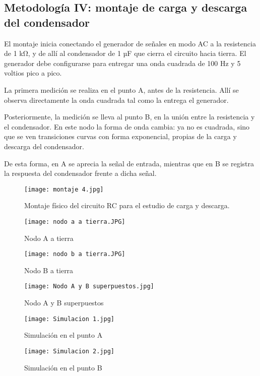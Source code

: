 \documentclass[conference]{IEEEtran} %
\begin{document}
\subsection{Metodología IV: montaje de carga y descarga del condensador}
El montaje inicia conectando el generador de señales en modo AC a la resistencia de 1 kΩ, y de allí al condensador de 1 µF que cierra el circuito hacia tierra. El generador debe configurarse para entregar una onda cuadrada de 100 Hz y 5 voltios pico a pico.

La primera medición se realiza en el punto A, antes de la resistencia. Allí se observa directamente la onda cuadrada tal como la entrega el generador.

Posteriormente, la medición se lleva al punto B, en la unión entre la resistencia y el condensador. En este nodo la forma de onda cambia: ya no es cuadrada, sino que se ven transiciones curvas con forma exponencial, propias de la carga y descarga del condensador.

De esta forma, en A se aprecia la señal de entrada, mientras que en B se registra la respuesta del condensador frente a dicha señal.

\begin{figure}[htbp]
    \centering
\texttt{[image: montaje 4.jpg]}
    \caption{Montaje físico del circuito RC para el estudio de carga y descarga.}
    \label{fig:montaje 4}
\end{figure}
\begin{figure}[htbp]
    \centering
\texttt{[image: nodo a a tierra.JPG]}
    \caption{Nodo A a tierra}
    \label{fig:montaje 4}
\end{figure}
\begin{figure}[htbp]
    \centering
\texttt{[image: nodo b a tierra.JPG]}
    \caption{Nodo B a tierra}
    \label{fig:montaje 4}
\end{figure}
\begin{figure}[htbp]
    \centering
\texttt{[image: Nodo A y B superpuestos.jpg]}
    \caption{Nodo A y B superpuestos}
    \label{fig:montaje 4}
\end{figure}
\begin{figure}[htbp]
    \centering
\texttt{[image: Simulacion 1.jpg]}
    \caption{Simulación en el punto A}
    \label{fig:simulacion-rc-esquematico}
\end{figure}
\begin{figure}[htbp]
    \centering
\texttt{[image: Simulacion 2.jpg]}
    \caption{Simulación en el punto B}
    \label{fig:simulacion-rc-respuesta}
\end{figure}
\end{document}
